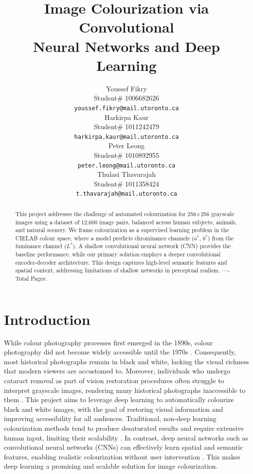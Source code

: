 \documentclass{article} %
\title{Image Colourization via Convolutional \\
Neural Networks and Deep Learning}
\author{Youssef Fikry  \\
Student\# 1006682626\\
\texttt{youssef.fikry@mail.utoronto.ca} \\
\And Harkirpa Kaur  \\
Student\# 1011242479 \\
\texttt{harkirpa.kaur@mail.utoronto.ca} \\
\AND
Peter Leong \\
Student\# 1010892955 \\
\texttt{peter.leong@mail.utoronto.ca} \\
\And
Thulasi Thavarajah \\
Student\# 1011358424 \\
\texttt{t.thavarajah@mail.utoronto.ca} \\
\AND
}
\begin{document}
\maketitle

\begin{abstract}
This project addresses the challenge of automated colourization for 256$\times$256 grayscale images using a dataset of 12,600 image pairs, balanced across human subjects, 
animals, and natural scenery. We frame colourization as a supervised learning problem in the CIELAB colour space, where a model predicts chrominance channels ($a^*$, $b^*$) 
from the luminance channel ($L^*$). A shallow convolutional neural network (CNN) provides the baseline performance, while our primary solution employs a deeper convolutional 
encoder-decoder architecture. This design captures high-level semantic features and spatial context, addressing limitations of shallow networks in perceptual realism.
----Total Pages: \pageref{last_page}
\end{abstract}


\section{Introduction}

While colour photography processes first emerged in the 1890s, colour photography did not become widely accessible until the 1970s \citep{scienceandmediamuseum2020}. 
Consequently, most historical photographs remain in black and white, lacking the visual richness that modern viewers are accustomed to. Moreover, individuals who undergo cataract 
removal as part of vision restoration procedures often struggle to interpret grayscale images, rendering many historical photographs inaccessible to them \citet{vogelsang2024impact}. 
This project aims to leverage deep learning to automatically colourize black and white images, with the goal of restoring visual information and improving accessibility for all audiences. 
Traditional, non-deep learning colourization methods tend to produce desaturated results and require extensive human input, limiting their scalability \citep{cheng2016deepcolorization}. 
In contrast, deep neural networks such as convolutional neural networks (CNNs) can effectively learn spatial and semantic features, enabling realistic colourization without user 
intervention \citep{zhang2016colorful}. This makes deep learning a promising and scalable solution for image colourization.
\end{document}
